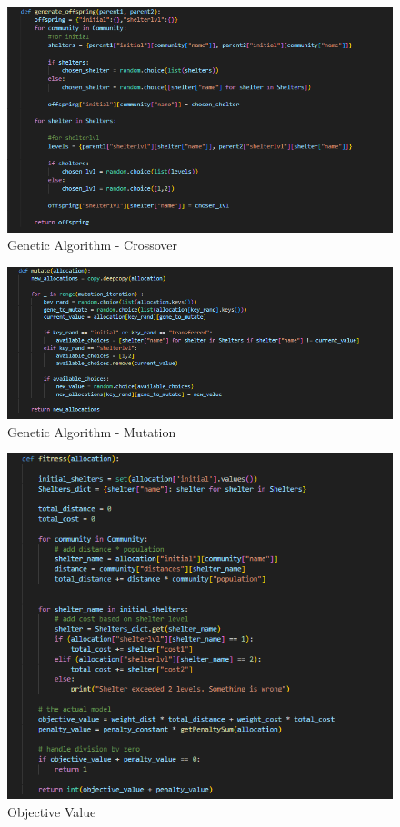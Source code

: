 \begin{appendices}
\begin{centerappendixtitle}
		\begin{figure}[h]
			\centering
			\caption{Genetic Algorithm - Crossover}
			\label{crossoverCode}
			\includegraphics[width=\linewidth]{appendix/crossover}
		\end{figure}
		
		\begin{figure}[h]
			\centering
			\caption{Genetic Algorithm - Mutation}
			\label{mutationCode}
			\includegraphics[width=\linewidth]{appendix/mutate}
		\end{figure}
		
		\begin{figure}[h]
			\centering
			\caption{Objective Value}
			\label{objValCode}
			\includegraphics[width=\linewidth]{appendix/fitness}
		\end{figure}
		

\end{centerappendixtitle}
\end{appendices}
